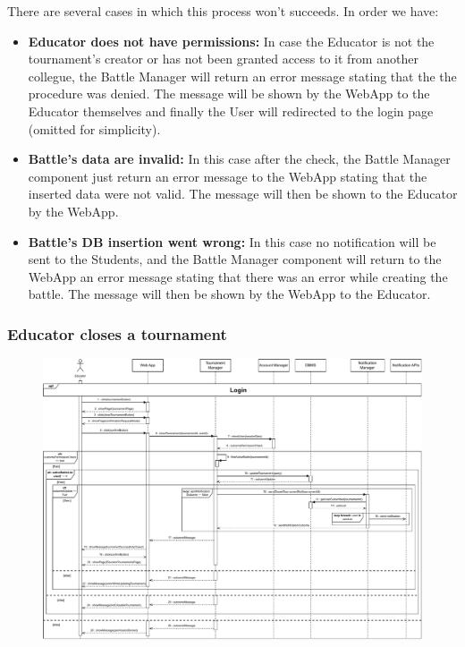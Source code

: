 \documentclass{article}
\begin{document}
{        There are several cases in which this process won't succeeds. In order we have:
        \begin{itemize}
            \item \textbf{Educator does not have permissions:} In case the Educator is not the 
            tournament's creator or has not been granted access to it from another collegue, 
            the Battle Manager will return an error message stating that the the procedure was 
            denied. 
            The message will be shown by the WebApp to the Educator themselves and finally
            the User will redirected to the login page (omitted for simplicity).
            \item \textbf{Battle's data are invalid:} In this case after the check, the Battle 
            Manager component just return an error message to the WebApp stating that the 
            inserted data were not valid. The message will then be shown to the Educator by 
            the WebApp.
            \item \textbf{Battle's DB insertion went wrong:} In this case no 
            notification will be sent to the Students, and the Battle Manager component will 
            return to the WebApp an error message stating that there was an error while 
            creating the battle.
            The message will then be shown by the WebApp to the Educator.
        \end{itemize}


    \subsubsection{Educator closes a tournament}
        \begin{figure}[H]
            \centering
            \hspace*{-4cm}\includegraphics[scale=0.65]{Sequence/Sequence7DD.pdf}
            \caption{}
            \label{fig:Sequence7DD}
        \end{figure}

}
\end{document}
